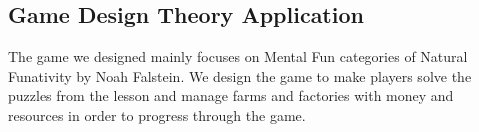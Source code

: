 \documentclass[12pt,oneside,openright,a4paper]{cpe-english-project}
\begin{document}
\subsection{Game Design Theory Application}
%
\hspace{2em}The game we designed mainly focuses on Mental Fun categories of Natural Funativity by Noah Falstein. We design the game to make players solve the puzzles from the lesson and manage farms and factories with money and resources in order to progress through the game.
\end{document}
